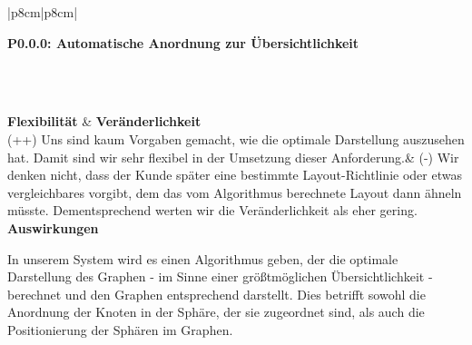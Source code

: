 \documentclass[enabledeprecatedfontcommands,fontsize=11pt,paper=a4,twoside]{scrartcl}
\newcounter{one}
\newcounter{two}[one]
\newcounter{three}[two]
\newcommand{\tone}{0\theone}
\newcommand{\ttwo}{0\thetwo}
\newcommand{\three}{\stepcounter{three}0\thethree}
\begin{document}
\begin{tabular} {|p{8cm}|p{8cm}|}
	\hline
	 {\parbox{16cm}{\textbf{\hypertarget{x}{P\tone.\ttwo.\three}: Automatische Anordnung zur Übersichtlichkeit}} } \\  \hline\hline 
	\rule{0pt}{7ex}\\ [3ex] \hline
	\textbf{Flexibilität}  & \textbf{Veränderlichkeit} \\
	(++) Uns sind kaum Vorgaben gemacht, wie die optimale Darstellung auszusehen hat. Damit sind wir sehr flexibel in der Umsetzung dieser Anforderung.& 
	(-) Wir denken nicht, dass der Kunde später eine bestimmte Layout-Richtlinie oder etwas vergleichbares vorgibt, dem das vom Algorithmus berechnete Layout dann ähneln müsste. Dementsprechend werten wir die Veränderlichkeit als eher gering.\\
	\hline
	 {\textbf{Auswirkungen}} \\
	 {\parbox{16cm}{In unserem System wird es einen Algorithmus geben, der die optimale Darstellung des Graphen - im Sinne einer größtmöglichen Übersichtlichkeit - berechnet und den Graphen entsprechend darstellt. Dies betrifft sowohl die Anordnung der Knoten in der Sphäre, der sie zugeordnet sind, als auch die Positionierung der Sphären im Graphen.} }\\ \hline
\end{tabular}
\\ \\ \\ \\%
\end{document}
